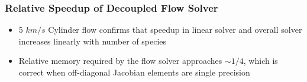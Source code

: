 \documentclass{beamer}
\begin{document}
\begin{frame}
  \frametitle{Relative Speedup of Decoupled Flow Solver}
  \vspace{-0.25cm}
  \begin{figure}[h]
    \centering
  \end{figure}
  \begin{itemize}
    \item 5 $km/s$ Cylinder flow confirms that speedup in linear solver and
      overall solver increases linearly with number of species
    \item Relative memory required by the flow solver approaches $\sim 1/4$,
      which is correct when off-diagonal Jacobian elements are single precision
  \end{itemize}
\end{frame}
\end{document}

